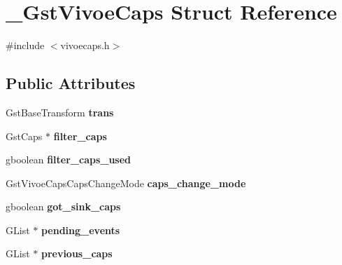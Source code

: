 \hypertarget{struct__GstVivoeCaps}{}\section{\+\_\+\+Gst\+Vivoe\+Caps Struct Reference}
\label{struct__GstVivoeCaps}


{\ttfamily \#include $<$vivoecaps.\+h$>$}

\subsection*{Public Attributes}
\begin{DoxyCompactItemize}
\item 
Gst\+Base\+Transform {\bfseries trans}\hypertarget{struct__GstVivoeCaps_a671f5ecd10e13003352d163c4dcccb5e}{}\label{struct__GstVivoeCaps_a671f5ecd10e13003352d163c4dcccb5e}

\item 
Gst\+Caps $\ast$ {\bfseries filter\+\_\+caps}\hypertarget{struct__GstVivoeCaps_ae40885baabd29cf15d8dc0f9ee4f002f}{}\label{struct__GstVivoeCaps_ae40885baabd29cf15d8dc0f9ee4f002f}

\item 
gboolean {\bfseries filter\+\_\+caps\+\_\+used}\hypertarget{struct__GstVivoeCaps_a3383cd0019decd5156711712fd05eb09}{}\label{struct__GstVivoeCaps_a3383cd0019decd5156711712fd05eb09}

\item 
Gst\+Vivoe\+Caps\+Caps\+Change\+Mode {\bfseries caps\+\_\+change\+\_\+mode}\hypertarget{struct__GstVivoeCaps_aeb676001a6b52c737a55da539d0f6ca8}{}\label{struct__GstVivoeCaps_aeb676001a6b52c737a55da539d0f6ca8}

\item 
gboolean {\bfseries got\+\_\+sink\+\_\+caps}\hypertarget{struct__GstVivoeCaps_a96c5c781b8175cf7b627a44980739884}{}\label{struct__GstVivoeCaps_a96c5c781b8175cf7b627a44980739884}

\item 
G\+List $\ast$ {\bfseries pending\+\_\+events}\hypertarget{struct__GstVivoeCaps_a473f6d4de14f3c992b668405ad3e4f01}{}\label{struct__GstVivoeCaps_a473f6d4de14f3c992b668405ad3e4f01}

\item 
G\+List $\ast$ {\bfseries previous\+\_\+caps}\hypertarget{struct__GstVivoeCaps_a64afa3e0610ada5096858436df552189}{}\label{struct__GstVivoeCaps_a64afa3e0610ada5096858436df552189}

\end{DoxyCompactItemize}


